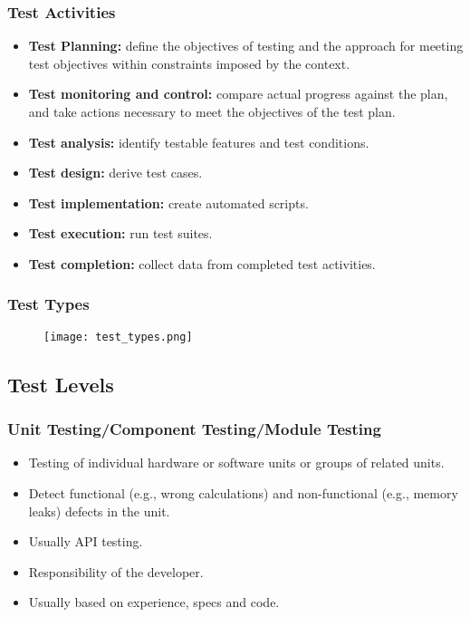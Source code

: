\documentclass[../ESOF_notes.tex]{subfiles}
\begin{document}
        \subsubsection{Test Activities}
            \begin{itemize}
                \item \textbf{Test Planning:} define the objectives of 
                testing and the approach for meeting test objectives 
                within constraints imposed by the context.
                \item \textbf{Test monitoring and control:} compare actual 
                progress against the plan, and take actions necessary 
                to meet the objectives of the test plan.
                \item \textbf{Test analysis:} identify testable features 
                and test conditions.
                \item \textbf{Test design:} derive test cases.
                \item \textbf{Test implementation:} create automated scripts.
                \item \textbf{Test execution:} run test suites.
                \item \textbf{Test completion:} collect data from completed 
                test activities.
            \end{itemize}
        \subsubsection{Test Types}
        \begin{figure}[h!]
            \centering
            \texttt{[image: test\_types.png]}
        \end{figure}
    \subsection{Test Levels}
        \subsubsection{Unit Testing/Component Testing/Module Testing}
            \begin{itemize}
                \item Testing of individual hardware or software units or 
                groups of related units.
                \item Detect functional (e.g., wrong calculations) 
                and non-functional (e.g., memory leaks) defects in 
                the unit.
                \item Usually API testing.
                \item Responsibility of the developer.
                \item Usually based on experience, specs and code.
            \end{itemize}
\end{document}
